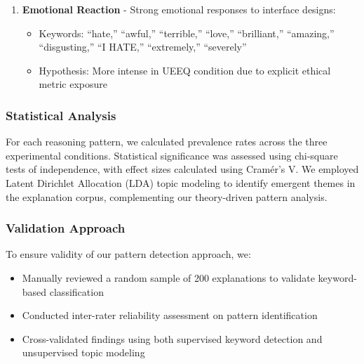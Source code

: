 \begin{enumerate}
\item \textbf{Emotional Reaction} - Strong emotional responses to interface designs:
\begin{itemize}
\item Keywords: ``hate,'' ``awful,'' ``terrible,'' ``love,'' ``brilliant,'' ``amazing,'' ``disgusting,'' ``I HATE,'' ``extremely,'' ``severely''
\item Hypothesis: More intense in UEEQ condition due to explicit ethical metric exposure
\end{itemize}

\end{enumerate}

\subsubsection{Statistical Analysis}
For each reasoning pattern, we calculated prevalence rates across the three experimental conditions. Statistical significance was assessed using chi-square tests of independence, with effect sizes calculated using Cramér's V. We employed Latent Dirichlet Allocation (LDA) topic modeling \cite{Blei2003} to identify emergent themes in the explanation corpus, complementing our theory-driven pattern analysis.

\subsubsection{Validation Approach}
To ensure validity of our pattern detection approach, we:
\begin{itemize}
\item Manually reviewed a random sample of 200 explanations to validate keyword-based classification
\item Conducted inter-rater reliability assessment on pattern identification
\item Cross-validated findings using both supervised keyword detection and unsupervised topic modeling
\end{itemize}
